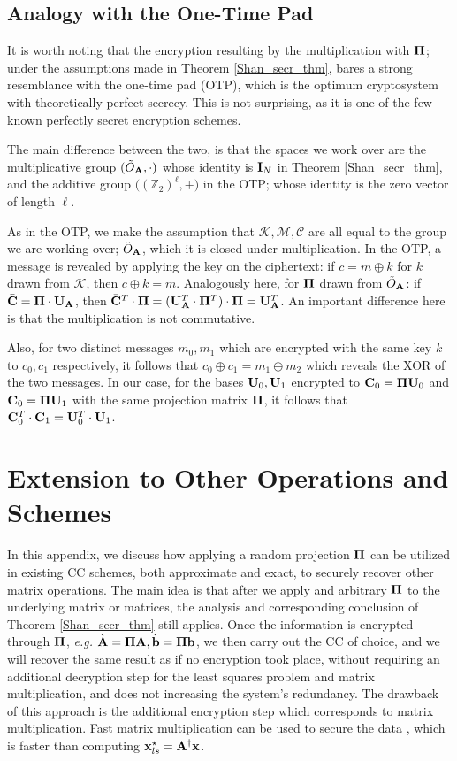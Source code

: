 \documentclass[journal,letterpaper,onecolumn,twoside,nofonttune]{IEEEtran}
\newcommand{\Cc}{\mathcal{C}}
\newcommand{\K}{\mathcal{K}}
\newcommand{\M}{\mathcal{M}}
\newcommand{\Otil}{\tilde{O}}
\newcommand{\Ub}{\bold{U}}
\newcommand{\xb}{\bold{x}}
\newcommand{\Pibold}{\bold{\Pi}}
\newcommand{\Z}{\mathbb{Z}}
\newcommand{\Ab}{\bold{A}}
\newcommand{\Abg}{{\grave{\bold{A}}}}
\newcommand{\bb}{\bold{b}}
\newcommand{\bbg}{{\grave{\bold{b}}}}
\newcommand{\Cb}{\bold{C}}
\newcommand{\Ib}{\bold{I}}
\begin{document}
\subsection{Analogy with the One-Time Pad}
\label{OTP_app}

It is worth noting that the encryption resulting by the multiplication with $\Pibold$; under the assumptions made in Theorem \ref{Shan_secr_thm}, bares a strong resemblance with the one-time pad (OTP), which is the optimum cryptosystem with theoretically perfect secrecy. This is not surprising, as it is one of the few known perfectly secret encryption schemes.

The main difference between the two, is that the spaces we work over are the multiplicative group $(\Otil_\Ab,\cdot)$ whose identity is $\Ib_N$ in Theorem \ref{Shan_secr_thm}, and the additive group $\big((\Z_2)^\ell,+\big)$ in the OTP; whose identity is the zero vector of length $\ell$.

As in the OTP, we make the assumption that $\K,\M,\Cc$ are all equal to the group we are working over; $\Otil_\Ab$, which it is closed under multiplication. In the OTP, a message is revealed by applying the key on the ciphertext: if $c=m\oplus k$ for $k$ drawn from $\K$, then $c\oplus k=m$. Analogously here, for $\Pibold$ drawn from $\Otil_\Ab$: if $\bar{\Cb}=\Pibold\cdot\Ub_\Ab$, then $\bar{\Cb}^T\cdot\Pibold=(\Ub_\Ab^T\cdot\Pibold^T)\cdot\Pibold=\Ub_\Ab^T$. An important difference here is that the multiplication is not commutative.

Also, for two distinct messages $m_0,m_1$ which are encrypted with the same key $k$ to $c_0,c_1$ respectively, it follows that $c_0\oplus c_1=m_1\oplus m_2$ which reveals the XOR of the two messages. In our case, for the bases $\Ub_0,\Ub_1$ encrypted to $\Cb_0=\Pibold\Ub_0$ and $\Cb_0=\Pibold\Ub_1$ with the same projection matrix $\Pibold$, it follows that $\Cb_0^T\cdot\Cb_1=\Ub_0^T\cdot\Ub_1$.

\section{Extension to Other Operations and Schemes}
\label{app_other_schemes}

In this appendix, we discuss how applying a random projection $\Pibold$ can be utilized in existing CC schemes, both approximate and exact, to securely recover other matrix operations. The main idea is that after we apply and arbitrary $\Pibold$ to the underlying matrix or matrices, the analysis and corresponding conclusion of Theorem \ref{Shan_secr_thm} still applies. Once the information is encrypted through $\Pibold$, \textit{e.g.} $\Abg=\Pibold\Ab,\bbg=\Pibold\bb$, we then carry out the CC of choice, and we will recover the same result as if no encryption took place, without requiring an additional decryption step for the least squares problem and matrix multiplication, and does not increasing the system's redundancy. The drawback of this approach is the additional encryption step which corresponds to matrix multiplication. Fast matrix multiplication can be used to secure the data \cite{Str69,AV21}, which is faster than computing $\xb_{ls}^{\star}=\Ab^{\dagger}\xb$.
\end{document}
